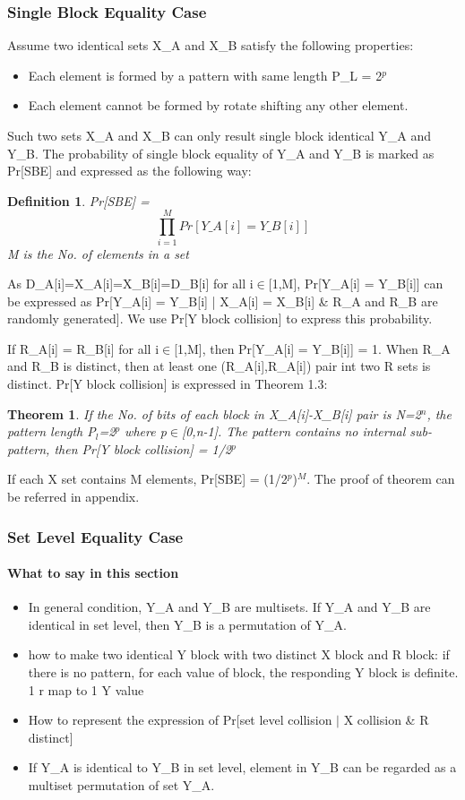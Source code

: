 \documentclass{article}
\newtheorem{theorem}{Theorem}[section]
\newtheorem{defination}{Definition}[section]
\begin{document}
\subsubsection{Single Block Equality Case}
Assume two identical sets X\_A and X\_B satisfy the following properties:
\begin{itemize}
	\item Each element is formed by a pattern with same length P\_L = 2$^p$
	\item Each element cannot be formed by rotate shifting any other element.
\end{itemize}
Such two sets X\_A and X\_B can only result single block identical Y\_A and Y\_B.
The probability of single block equality of Y\_A and Y\_B is marked as Pr[SBE] and expressed as the following way:
\begin{defination}
Pr[SBE] = $$\prod_{i=1}^M Pr[Y\_A[i] = Y\_B[i]]$$ M is the No. of elements in a set
\end{defination} 

As D\_A[i]=X\_A[i]=X\_B[i]=D\_B[i] for all i$\in$[1,M], Pr[Y\_A[i] = Y\_B[i]] can be expressed as Pr[Y\_A[i] = Y\_B[i] | X\_A[i] = X\_B[i] \& R\_A and R\_B are randomly generated]. We use Pr[Y block collision] to express this probability. 

If R\_A[i] = R\_B[i] for all i$\in$[1,M], then Pr[Y\_A[i] = Y\_B[i]] = 1. When R\_A and R\_B is distinct, then at least one (R\_A[i],R\_A[i]) pair int two R sets is distinct.  Pr[Y block collision] is expressed in Theorem 1.3:
\begin{theorem}
If the No. of bits of each block in X\_A[i]-X\_B[i] pair is N=2$^n$, the pattern length P$_l$=2$^p$ where p$\in$[0,n-1]. The pattern contains no internal sub-pattern, then Pr[Y block collision] = 1/2$^p$
\end{theorem}
If each X set contains M elements, Pr[SBE] = (1/2$^p$)$^M$.
The proof of theorem can be referred in appendix.

\subsubsection{Set Level Equality Case}
\paragraph{What to say in this section}
\begin{itemize}
	\item In general condition, Y\_A and Y\_B are multisets. If Y\_A and Y\_B are identical in set level, then Y\_B is a permutation of Y\_A.
	\item how to make two identical Y block with two distinct X block and R block: if there is no pattern, for each value of block, the responding Y block is definite. 1 r map to 1 Y value
	\item How to represent the expression of Pr[set level collision $\mid$ X collision \& R distinct]
	\item If Y\_A is identical to Y\_B in set level, element in Y\_B can be regarded as a multiset permutation of set Y\_A.
\end{itemize}
\end{document}
